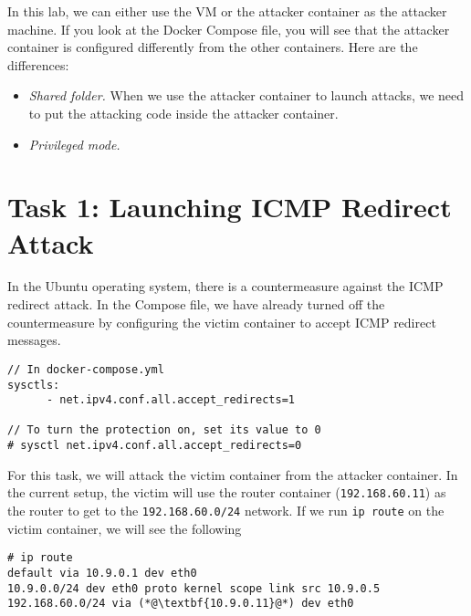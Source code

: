 In this lab, we can either use the VM or the attacker container
as the attacker machine. If you look at the Docker Compose file, you will
see that the attacker container is configured differently from the other
containers. Here are the differences:

\begin{itemize}
\item \textit{Shared folder.} When we use the attacker container
to launch attacks, we need to put the attacking code inside
the attacker container.


\item \textit{Privileged mode.}


\end{itemize}


\section{Task 1: Launching ICMP Redirect Attack}

In the Ubuntu operating system, 
there is a countermeasure against the ICMP redirect attack. In the 
Compose file, we have already 
turned off the countermeasure by configuring the victim container
to accept ICMP redirect messages. 

\begin{lstlisting}
// In docker-compose.yml
sysctls:
      - net.ipv4.conf.all.accept_redirects=1

// To turn the protection on, set its value to 0
# sysctl net.ipv4.conf.all.accept_redirects=0
\end{lstlisting}


For this task, we will attack the victim container from 
the attacker container. In the current setup, 
the victim will use the router container (\texttt{192.168.60.11}) as
the router to get to the \texttt{192.168.60.0/24} network. If
we run \texttt{ip route} on the victim container, we will
see the following

\begin{lstlisting}
# ip route
default via 10.9.0.1 dev eth0 
10.9.0.0/24 dev eth0 proto kernel scope link src 10.9.0.5 
192.168.60.0/24 via (*@\textbf{10.9.0.11}@*) dev eth0
\end{lstlisting}
 

